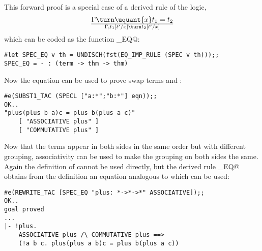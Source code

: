 This forward proof is a special case of a derived
rule of the logic,
\[
\Gamma\turn \uquant{x} t_1 = t_2
\over
\Gamma, t_1[t'/x] \turn t_2[t'/x]
\]
which can be coded as the \ML{} function \verb@SPEC_EQ@:
\begin{session}
\begin{verbatim}
#let SPEC_EQ v th = UNDISCH(fst(EQ_IMP_RULE (SPEC v th)));;
SPEC_EQ = - : (term -> thm -> thm)
\end{verbatim}
\end{session}
Now the equation \verb@eqn@ can be used to prove swap terms
\verb@a@ and \verb@b@:
\begin{session}
\begin{verbatim}
#e(SUBST1_TAC (SPECL ["a:*";"b:*"] eqn));;
OK..
"plus(plus b a)c = plus b(plus a c)"
    [ "ASSOCIATIVE plus" ]
    [ "COMMUTATIVE plus" ]
\end{verbatim}
\end{session}
Now that the terms appear in both sides in the same order but with different
grouping, associativity can be used to make the grouping on both sides
the same.  Again the definition of \verb@ASSOCIATIVE@ cannot be used
directly, but the derived rule \verb@SPEC_EQ@ obtains from the definition
an equation analogous to \verb@eqn@ which can be used:
\begin{session}
\begin{verbatim}
#e(REWRITE_TAC [SPEC_EQ "plus: *->*->*" ASSOCIATIVE]);;
OK..
goal proved
...
|- !plus.
    ASSOCIATIVE plus /\ COMMUTATIVE plus ==>
    (!a b c. plus(plus a b)c = plus b(plus a c))
\end{verbatim}
\end{session}

